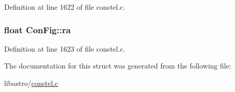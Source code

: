 Definition at line 1622 of file constel.\-c.

\hypertarget{struct_con_fig_a3f87e2c516969cd5f37dcdd271f7eac5}{
\subsubsection[{ra}]{\setlength{\rightskip}{0pt plus 5cm}float Con\-Fig\-::ra}}\label{struct_con_fig_a3f87e2c516969cd5f37dcdd271f7eac5}


Definition at line 1623 of file constel.\-c.



The documentation for this struct was generated from the following file\-:\begin{DoxyCompactItemize}
\item 
libastro/\hyperlink{constel_8c}{constel.\-c}\end{DoxyCompactItemize}
